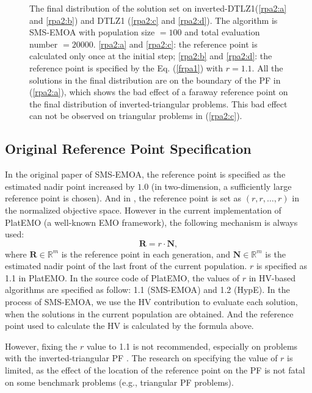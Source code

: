 \documentclass[conference]{IEEEtran}
\begin{document}
\begin{figure}[!t]
  \caption{The final distribution of the solution set on inverted-DTLZ1(\ref{rpa2:a} and \ref{rpa2:b}) 
  and DTLZ1 (\ref{rpa2:c} and \ref{rpa2:d}).
  The algorithm is SMS-EMOA with population size $= 100$ and total evaluation number $= 20000$. 
  \ref{rpa2:a} and \ref{rpa2:c}: the reference point is calculated only once at the initial step;
  \ref{rpa2:b} and \ref{rpa2:d}: the reference point is specified by the Eq. (\ref{frpa1}) with $r=1.1$.
  All the solutions in the final distribution are on the boundary of the PF in (\ref{rpa2:a}),
  which shows the bad effect of a faraway reference point
  on the final distribution of inverted-triangular problems. 
  This bad effect can not be observed on triangular problems in (\ref{rpa2:c}).
  }
  \label{rpa2}
\end{figure}

\subsection{Original Reference Point Specification}
In the original paper of SMS-EMOA\cite{smsemoa}, 
the reference point is specified as the estimated nadir point increased by $\boldsymbol{1.0}$
(in two-dimension, a sufficiently large reference point is chosen). 
And in \cite{hisao:dynamic}, the reference point is set as $(r, r, \dots, r)$ in the normalized objective space. 
However in the current implementation of PlatEMO\cite{PlatEMO} (a well-known EMO framework), the following mechanism is always used:
\begin{equation}\label{frpa1}
  \boldsymbol R = r \cdot \boldsymbol N,  
\end{equation}
where $\boldsymbol R \in \mathbb{R}^m$ is the reference point in each generation, 
and $\boldsymbol N \in \mathbb{R}^m$ is the estimated nadir point of the last front of the current population. 
$r$ is specified as 1.1 in PlatEMO. 
In the source code of PlatEMO, the values of $r$ in HV-based algorithms are specified as follow: 
1.1 (SMS-EMOA\cite{smsemoa}) and 1.2 (HypE\cite{HypE}). %
In the process of SMS-EMOA,  
we use the HV contribution to evaluate each solution, when the solutions in the current population are obtained. 
And the reference point used to calculate the HV is calculated by the formula above. 

However, fixing the $r$ value to 1.1 is not recommended, especially on problems with the inverted-triangular PF
\cite{hisao:RPhowtoSpecify}. 
The research on specifying the value of $r$ is limited, 
as the effect of the location of the reference point on the PF 
is not fatal on some benchmark problems (e.g., triangular PF problems). 
\end{document}
